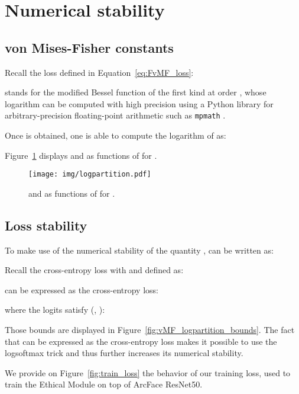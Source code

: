 \documentclass[nohyperref]{article}
\theoremstyle{plain}
\theoremstyle{definition}
\theoremstyle{remark}
\begin{document}




\newpage
\appendix
\onecolumn

\section{Numerical stability}\label{app:numerical_stability}

\subsection{von Mises-Fisher constants}\label{app:vMF_constants}

Recall the loss defined in Equation~\ref{eq:FvMF_loss}:


 stands for the modified Bessel function of the first kind at order , whose logarithm can be computed with high precision using a Python library for arbitrary-precision floating-point arithmetic such as \texttt{mpmath}
\cite{mpmath,vmf_pytorch_implementation}.

Once  is obtained, one is able to compute the logarithm of  as:

Figure~\ref{fig:vMF_logpartition} displays  and  as functions of  for .

\begin{figure}[ht!]
    \centering
    \texttt{[image: img/logpartition.pdf]}
    \caption{ and  as functions of  for .}
    \label{fig:vMF_logpartition}
\end{figure}

\subsection{Loss stability}

To make use of the numerical stability of the quantity ,  can be written as:


Recall the cross-entropy loss  with  and  defined as:


 can be expressed as the cross-entropy loss:

where the logits  satisfy (, ):


Those bounds are displayed in Figure~\ref{fig:vMF_logpartition_bounds}. The fact that  can be expressed as the cross-entropy loss makes it possible to use the logsoftmax trick and thus further increases its numerical stability. 

We provide on Figure~\ref{fig:train_loss} the behavior of our  training loss, used to train the Ethical Module on top of ArcFace ResNet50.
\end{document}
